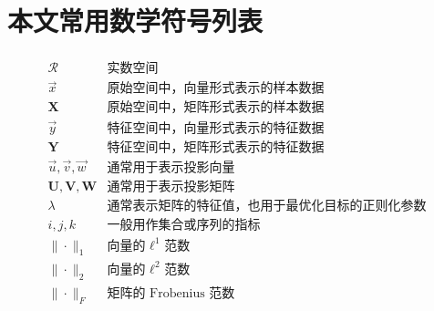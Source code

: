 \chapter{本文常用数学符号列表}

\begin{center}

\begin{eqnarray*}
\begin{array}{ll}
\mathcal{R} & \text{实数空间} \\
\vec{x} & \text{原始空间中，向量形式表示的样本数据} \\
\textbf{X} & \text{原始空间中，矩阵形式表示的样本数据} \\
\vec{y} & \text{特征空间中，向量形式表示的特征数据} \\
\textbf{Y} & \text{特征空间中，矩阵形式表示的特征数据} \\
\vec{u},\vec{v},\vec{w} & \text{通常用于表示投影向量} \\
\textbf{U},\textbf{V},\textbf{W} & \text{通常用于表示投影矩阵} \\
\lambda & \text{通常表示矩阵的特征值，也用于最优化目标的正则化参数} \\
i, j, k & \text{一般用作集合或序列的指标} \\
\| \cdot \|_1 & \text{向量的 $\ell^1$ 范数} \\
\| \cdot \|_2 & \text{向量的 $\ell^2$ 范数} \\
\| \cdot \|_F & \text{矩阵的 Frobenius 范数} \\
\end{array}
\end{eqnarray*}

\end{center}